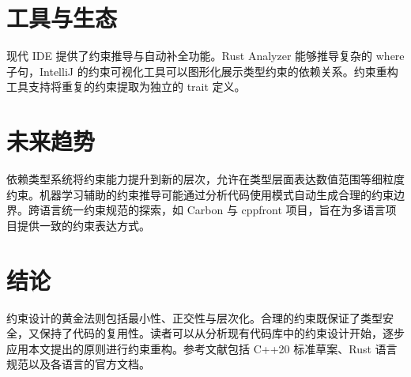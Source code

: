 \chapter{工具与生态}
现代 IDE 提供了约束推导与自动补全功能。Rust Analyzer 能够推导复杂的 where 子句，IntelliJ 的约束可视化工具可以图形化展示类型约束的依赖关系。约束重构工具支持将重复的约束提取为独立的 trait 定义。\par
\chapter{未来趋势}
依赖类型系统将约束能力提升到新的层次，允许在类型层面表达数值范围等细粒度约束。机器学习辅助的约束推导可能通过分析代码使用模式自动生成合理的约束边界。跨语言统一约束规范的探索，如 Carbon 与 cppfront 项目，旨在为多语言项目提供一致的约束表达方式。\par
\chapter{结论}
约束设计的黄金法则包括最小性、正交性与层次化。合理的约束既保证了类型安全，又保持了代码的复用性。读者可以从分析现有代码库中的约束设计开始，逐步应用本文提出的原则进行约束重构。参考文献包括 C++20 标准草案、Rust 语言规范以及各语言的官方文档。\par
